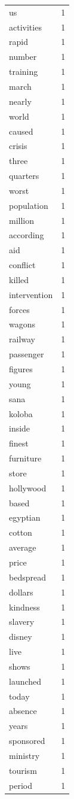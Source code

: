 \begin{tabular}{lr}
us & 1 \\
activities & 1 \\
rapid & 1 \\
number & 1 \\
training & 1 \\
march & 1 \\
nearly & 1 \\
world & 1 \\
caused & 1 \\
crisis & 1 \\
three & 1 \\
quarters & 1 \\
worst & 1 \\
population & 1 \\
million & 1 \\
according & 1 \\
aid & 1 \\
conflict & 1 \\
killed & 1 \\
intervention & 1 \\
forces & 1 \\
wagons & 1 \\
railway & 1 \\
passenger & 1 \\
figures & 1 \\
young & 1 \\
sana & 1 \\
koloba & 1 \\
inside & 1 \\
finest & 1 \\
furniture & 1 \\
store & 1 \\
hollywood & 1 \\
based & 1 \\
egyptian & 1 \\
cotton & 1 \\
average & 1 \\
price & 1 \\
bedspread & 1 \\
dollars & 1 \\
kindness & 1 \\
slavery & 1 \\
disney & 1 \\
live & 1 \\
shows & 1 \\
launched & 1 \\
today & 1 \\
absence & 1 \\
years & 1 \\
sponsored & 1 \\
ministry & 1 \\
tourism & 1 \\
period & 1 \\
\bottomrule
\end{tabular}

